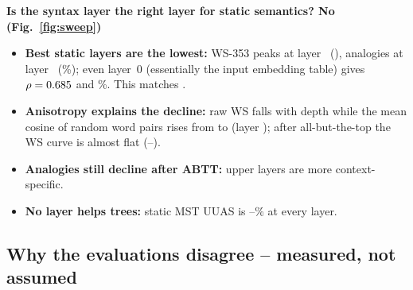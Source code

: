 \documentclass[11pt,a4paper]{article}
\newcommand{\blk}[1]{\par\needspace{5\baselineskip}\smallskip\noindent\textbf{#1}\par\nobreak\vspace{1pt}}
\begin{document}
\blk{Is the syntax layer the right layer for static semantics? No (Fig.~\ref{fig:sweep})}
\begin{itemize}
\item \textbf{Best static layers are the lowest:} WS-353 peaks at layer~\BestSemLayer{} (\BestSemWS), analogies at layer~\BestAnLayer{}
(\BestAnAcc\%); even layer~0 (essentially the input embedding table) gives $\rho=0.685$ and \LzeroAn\%. This matches \citet{bommasani}.
\item \textbf{Anisotropy explains the decline:} raw WS falls with depth while the mean cosine of random word pairs rises from \AnisoLzero{} to
\AnisoMax{} (layer \AnisoMaxLayer); after all-but-the-top the WS curve is almost flat (\AbttWSMin--\AbttWSMax).
\item \textbf{Analogies still decline after ABTT:} upper layers are more context-specific.
\item \textbf{No layer helps trees:} static MST UUAS is \StaticMSTMin--\StaticMSTMax\% at every layer.
\end{itemize}

\subsection{Why the evaluations disagree -- measured, not assumed}\label{sec:why}
\begin{table}[t]\centering\footnotesize\setlength{\tabcolsep}{4pt}
\caption{The diagnostic ladder on the same sentences. Edge AUC: within each pool sentence, the probability that a gold edge
pair is closer than a non-edge pair (0.5 = no information), averaged over sentences. Tier: req.\ = required, B/C = our extensions.}
\label{tab:ladder}\end{table}
\begin{table}[t]\centering\footnotesize\setlength{\tabcolsep}{4pt}
\caption{Diagnostics (\texttt{diagnostics\_task3.py}). NN statistics use the 2,134 types with train frequency $\ge$10 and the
majority UPOS of each type; hubness uses the 3,919 types with frequency $\ge$5; MST statistics use the 660-sentence pool.}
\label{tab:diag}\end{table}
\end{document}

